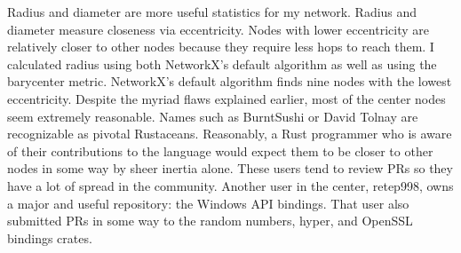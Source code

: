 \documentclass[12pt, a4paper]{article}
\begin{document}
Radius and diameter are more useful statistics for my network. Radius and diameter measure closeness via eccentricity. Nodes with lower eccentricity are relatively closer to other nodes because they require less hops to reach them. I calculated radius using both NetworkX's default algorithm as well as using the barycenter metric. NetworkX's default algorithm finds nine nodes with the lowest eccentricity. Despite the myriad flaws explained earlier, most of the center nodes seem extremely reasonable. Names such as BurntSushi or David Tolnay are recognizable as pivotal Rustaceans. Reasonably, a Rust programmer who is aware of their contributions to the language would expect them to be closer to other nodes in some way by sheer inertia alone. These users tend to review PRs so they have a lot of spread in the community. Another user in the center, retep998, owns a major and useful repository: the Windows API bindings. That user also submitted PRs in some way to the random numbers, hyper, and OpenSSL bindings crates.

\printbibliography
\end{document}
